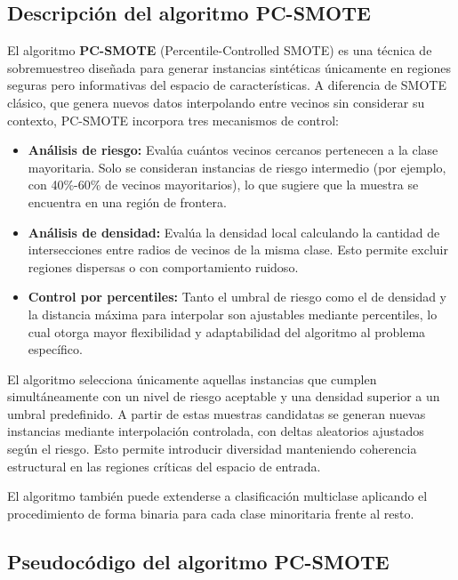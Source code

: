 \subsection{Descripción del algoritmo PC-SMOTE}

El algoritmo \textbf{PC-SMOTE} (Percentile-Controlled SMOTE) es una técnica de sobremuestreo diseñada para generar instancias sintéticas únicamente en regiones seguras pero informativas del espacio de características. A diferencia de SMOTE clásico, que genera nuevos datos interpolando entre vecinos sin considerar su contexto, PC-SMOTE incorpora tres mecanismos de control:

\begin{itemize}
  \item \textbf{Análisis de riesgo:} Evalúa cuántos vecinos cercanos pertenecen a la clase mayoritaria. Solo se consideran instancias de riesgo intermedio (por ejemplo, con 40\%-60\% de vecinos mayoritarios), lo que sugiere que la muestra se encuentra en una región de frontera.
  
  \item \textbf{Análisis de densidad:} Evalúa la densidad local calculando la cantidad de intersecciones entre radios de vecinos de la misma clase. Esto permite excluir regiones dispersas o con comportamiento ruidoso.
  
  \item \textbf{Control por percentiles:} Tanto el umbral de riesgo como el de densidad y la distancia máxima para interpolar son ajustables mediante percentiles, lo cual otorga mayor flexibilidad y adaptabilidad del algoritmo al problema específico.
\end{itemize}

El algoritmo selecciona únicamente aquellas instancias que cumplen simultáneamente con un nivel de riesgo aceptable y una densidad superior a un umbral predefinido. A partir de estas muestras candidatas se generan nuevas instancias mediante interpolación controlada, con deltas aleatorios ajustados según el riesgo. Esto permite introducir diversidad manteniendo coherencia estructural en las regiones críticas del espacio de entrada.

El algoritmo también puede extenderse a clasificación multiclase aplicando el procedimiento de forma binaria para cada clase minoritaria frente al resto.

\subsection{Pseudocódigo del algoritmo PC-SMOTE}

